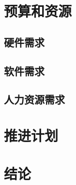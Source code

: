 \documentclass{article}
\begin{document}
\section{预算和资源}
\subsection{硬件需求}
\subsection{软件需求}
\subsection{人力资源需求}
\section{推进计划}
\section{结论}
\end{document}
